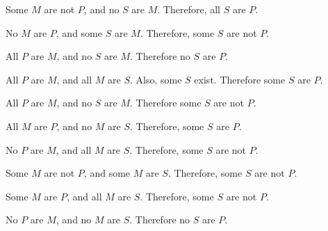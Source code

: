 \begin{exercises} 
 
\item Some $M$ are not $P$, and no $S$ are $M$. Therefore, all $S$ are $P$.
 
\item No $M$ are $P$, and some $S$ are $M$. Therefore, some $S$ are not $P$.
 
\item All $P$ are $M$, and no $S$ are $M$. Therefore no $S$ are $P$. 
 
\item All $P$ are $M$, and all $M$ are $S$. Also, some $S$ exist. Therefore some $S$ are $P$. 
  
\item All $P$ are $M$, and no $S$ are $M$. Therefore some $S$ are not $P$. 
 
\item All $M$ are $P$, and no $M$ are $S$. Therefore, some $S$ are $P$.
 
\item No $P$ are $M$, and all $M$ are $S$. Therefore, some $S$ are not $P$.
 
\item Some $M$ are not $P$, and some $M$ are $S$. Therefore, some $S$ are not $P$.
  
\item Some $M$ are $P$, and all $M$ are $S$. Therefore, some $S$ are not $P$.
 
\item No $P$ are $M$, and no $M$ are $S$. Therefore no $S$ are $P$.
 
\end{exercises}


